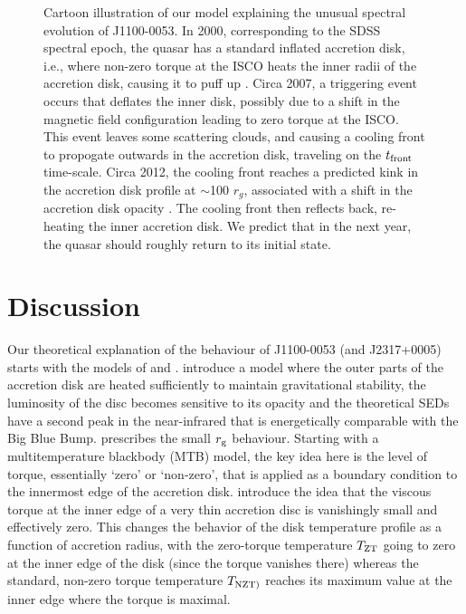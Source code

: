 \documentclass{nature}
\begin{document}
\begin{figure}
{    Cartoon illustration of our model explaining the unusual spectral evolution of J1100-0053. In 2000, corresponding to the SDSS spectral epoch, the quasar has a standard inflated accretion disk, i.e., where non-zero torque at the ISCO heats the inner radii of the accretion disk, causing it to puff up \citep[e.g.,][]{Zimmerman2005}. Circa 2007, a triggering event occurs that deflates the inner disk, possibly due to a shift in the magnetic field configuration leading to zero torque at the ISCO.  This event leaves some scattering clouds, and causing a cooling front to propogate outwards in the accretion disk, traveling on the $t_{\rm front}$ time-scale. Circa 2012, the cooling front reaches a predicted kink in the accretion disk profile at $\sim$100 $r_{g}$, associated with a shift in the accretion disk opacity \citep[e.g., Figure 2 of ][]{Sirko_Goodman2003}.  The cooling front then reflects back, re-heating the inner accretion disk. We predict that in the next year, the quasar should roughly return to its initial state.}
  \label{fig:J110057_diskmodel}
\end{figure}

\section{Discussion} 
Our theoretical explanation of the behaviour of J1100-0053 (and J2317+0005) starts with the models of \cite{Sirko_Goodman2003} and \cite{Zimmerman2005}. \cite{Sirko_Goodman2003} introduce a model where the outer parts of the accretion disk are heated sufficiently to maintain gravitational stability, the luminosity of the disc becomes sensitive to its opacity and the theoretical SEDs have a second peak in the near-infrared that is energetically comparable with the Big Blue Bump. \cite{Zimmerman2005} prescribes the small $r_{\rm g}$ behaviour. Starting with a multitemperature blackbody (MTB) model, the key idea here is the level of torque, essentially `zero' or `non-zero', that is applied as a boundary condition to the innermost edge of the accretion disk. \cite{Zimmerman2005} introduce the idea that the viscous torque at the inner edge of a very thin accretion disc is vanishingly small and effectively zero. This changes the behavior of the disk temperature profile as a function of accretion radius, with the zero-torque temperature $T_{\rm ZT}$ going to zero at the inner edge of the disk (since the torque vanishes there) whereas the standard, non-zero torque temperature  $T_{\rm NZT)}$ reaches its maximum value at the inner edge where the torque is maximal. 
\end{document}
